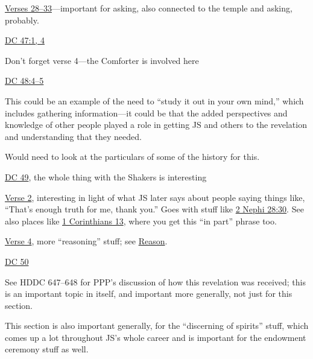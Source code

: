 \begin{compactdesc}
\begin{compactitem}
					\item \hyperref[DC46-28]{Verses 28--33}---important for asking, also connected to the temple and asking, probably.
				\end{compactitem}
			\item \hyperref[DC47-1]{DC 47:1, 4}
				\begin{compactitem}
					\item Don't forget verse 4---the Comforter is involved here
				\end{compactitem}
			\item \hyperref[DC48-4]{DC 48:4--5}
				\begin{compactitem}
					\item This could be an example of the need to ``study it out in your own mind,'' which includes gathering information---it could be that the added perspectives and knowledge of other people played a role in getting JS and others to the revelation and understanding that they needed. 
					\item Would need to look at the particulars of some of the history for this.
				\end{compactitem} 
			\item \hyperref[DC49]{DC 49}, the whole thing with the Shakers is interesting
				\begin{compactitem}
					\item \hyperref[DC49-2]{Verse 2}, interesting in light of what JS later says about people saying things like, ``That's enough truth for me, thank you.'' Goes with stuff like \hyperref[2NEPHI-28-30]{2 Nephi 28:30}. See also places like \hyperref[1CORINTHIANS-13]{1 Corinthians 13}, where you get this ``in part'' phrase too.
					\item \hyperref[DC49-4]{Verse 4}, more ``reasoning'' stuff; see \hyperref[REASON]{Reason}.
				\end{compactitem}
			\item \hyperref[DC50]{DC 50}
				\begin{compactitem}
					\item See HDDC 647--648 for PPP's discussion of how this revelation was received; this is an important topic in itself, and important more generally, not just for this section.
					\item This section is also important generally, for the ``discerning of spirits'' stuff, which comes up a lot throughout JS's whole career and is important for the endowment ceremony stuff as well.
						\begin{compactitem}

\end{compactitem}
\end{compactitem}
\end{compactdesc}
